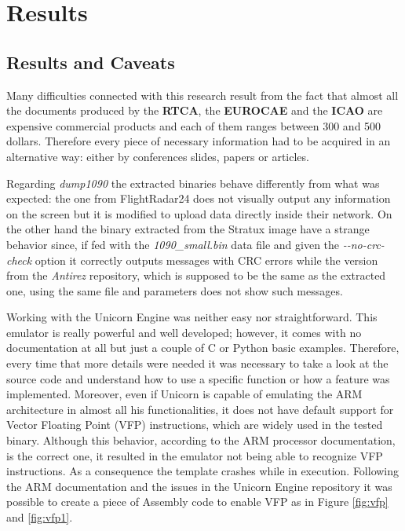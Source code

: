 \documentclass[../main.tex]{subfiles}
\begin{document}
\chapter{Results}
\label{chap:resconc}

\section{Results and Caveats}

Many difficulties connected with this research result from the fact that almost all the documents produced by the \textbf{RTCA}, the \textbf{EUROCAE} and the \textbf{ICAO} are expensive commercial products and each of them ranges between 300 and 500 dollars. Therefore every piece of necessary information had to be acquired in an alternative way: either by conferences slides, papers or articles.

Regarding \textit{dump1090} the extracted binaries behave differently from what was expected: the one from FlightRadar24 does not visually output any information on the screen but it is modified to upload data directly inside their network. On the other hand the binary extracted from the Stratux image have a strange behavior since, if fed with the \textit{1090\_small.bin} data file and given the \textit{-{}-no-crc-check} option it correctly outputs messages with CRC errors while the version from the \textit{Antirez} repository, which is supposed to be the same as the extracted one, using the same file and parameters does not show such messages.

Working with the Unicorn Engine was neither easy nor straightforward. This emulator is really powerful and well developed; however, it comes with no documentation at all but just a couple of C or Python basic examples. Therefore, every time that more details were needed it was necessary to take a look at the source code and understand how to use a specific function or how a feature was implemented. Moreover, even if Unicorn is capable of emulating the ARM architecture in almost all his functionalities, it does not have default support for Vector Floating Point (VFP) instructions, which are widely used in the tested binary. Although this behavior, according to the ARM processor documentation, is the correct one, it resulted in the emulator not being able to recognize VFP instructions. As a consequence the template crashes while in execution. Following the ARM documentation and the issues in the Unicorn Engine repository it was possible to create a piece of Assembly code to enable VFP as in Figure \ref{fig:vfp} and \ref{fig:vfp1}.
\end{document}
